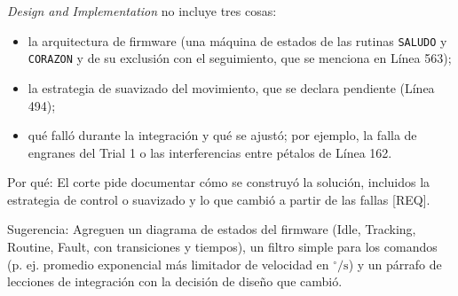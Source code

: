 \documentclass{LabDSTresponse}
\begin{document}
{\textit{Design and Implementation} no incluye tres cosas:
\begin{itemize}
    \item la arquitectura de firmware (una máquina de estados de las rutinas \texttt{SALUDO} y \texttt{CORAZON} y de su exclusión con el seguimiento, que se menciona en Línea 563);
    \item la estrategia de suavizado del movimiento, que se declara pendiente (Línea 494);
    \item qué falló durante la integración y qué se ajustó; por ejemplo, la falla de engranes del Trial 1 o las interferencias entre pétalos de Línea 162.
\end{itemize}
Por qué: El corte pide documentar cómo se construyó la solución, incluidos la estrategia de control o suavizado y lo que cambió a partir de las fallas [REQ].

Sugerencia: Agreguen un diagrama de estados del firmware (Idle, Tracking, Routine, Fault, con transiciones y tiempos), un filtro simple para los comandos (p. ej. promedio exponencial más limitador de velocidad en $^\circ\text{/s}$) y un párrafo de lecciones de integración con la decisión de diseño que cambió.}
\end{document}
